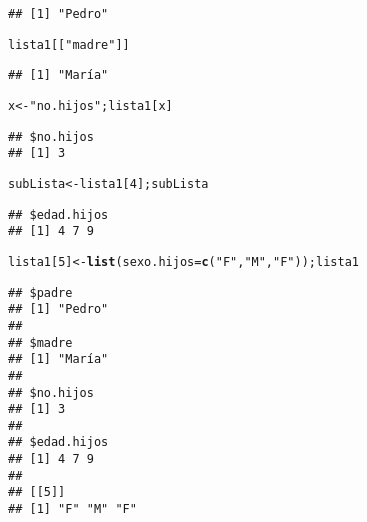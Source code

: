 \documentclass[10pt,a4paper]{article}\usepackage[]{graphicx}\usepackage[]{color}
\makeatletter
\newcommand{\hlnum}[1]{\textcolor[rgb]{0.686,0.059,0.569}{#1}}%
\newcommand{\hlstr}[1]{\textcolor[rgb]{0.192,0.494,0.8}{#1}}%
\newcommand{\hlstd}[1]{\textcolor[rgb]{0.345,0.345,0.345}{#1}}%
\newcommand{\hlkwb}[1]{\textcolor[rgb]{0.69,0.353,0.396}{#1}}%
\newcommand{\hlkwc}[1]{\textcolor[rgb]{0.333,0.667,0.333}{#1}}%
\newcommand{\hlkwd}[1]{\textcolor[rgb]{0.737,0.353,0.396}{\textbf{#1}}}%
\newenvironment{kframe}{%
 \def\at@end@of@kframe{}%
 \ifinner\ifhmode%
  \def\at@end@of@kframe{\end{minipage}}%
  \begin{minipage}{\columnwidth}%
 \fi\fi%
 \def\FrameCommand##1{\hskip\@totalleftmargin \hskip-\fboxsep
 \colorbox{shadecolor}{##1}\hskip-\fboxsep
     \hskip-\linewidth \hskip-\@totalleftmargin \hskip\columnwidth}%
 \MakeFramed {\advance\hsize-\width
   \@totalleftmargin\z@ \linewidth\hsize
   \@setminipage}}%
 {\par\unskip\endMakeFramed%
 \at@end@of@kframe}
\newenvironment{knitrout}{}{} %
\makeatother
\begin{document}
\begin{knitrout}
\begin{kframe}
\begin{verbatim}
## [1] "Pedro"
\end{verbatim}
\begin{alltt}
\hlstd{lista1[[}\hlstr{"madre"}\hlstd{]]}
\end{alltt}
\begin{verbatim}
## [1] "María"
\end{verbatim}
\begin{alltt}
\hlstd{x} \hlkwb{<-} \hlstr{"no.hijos"}\hlstd{;  lista1[x]}
\end{alltt}
\begin{verbatim}
## $no.hijos
## [1] 3
\end{verbatim}
\begin{alltt}
\hlstd{subLista} \hlkwb{<-} \hlstd{lista1[}\hlnum{4}\hlstd{]; subLista}
\end{alltt}
\begin{verbatim}
## $edad.hijos
## [1] 4 7 9
\end{verbatim}
\begin{alltt}
\hlstd{lista1[}\hlnum{5}\hlstd{]} \hlkwb{<-} \hlkwd{list}\hlstd{(}\hlkwc{sexo.hijos}\hlstd{=}\hlkwd{c}\hlstd{(}\hlstr{"F"}\hlstd{,} \hlstr{"M"}\hlstd{,} \hlstr{"F"}\hlstd{)); lista1}
\end{alltt}
\begin{verbatim}
## $padre
## [1] "Pedro"
## 
## $madre
## [1] "María"
## 
## $no.hijos
## [1] 3
## 
## $edad.hijos
## [1] 4 7 9
## 
## [[5]]
## [1] "F" "M" "F"
\end{verbatim}
\end{kframe}
\end{knitrout}
\end{document}
